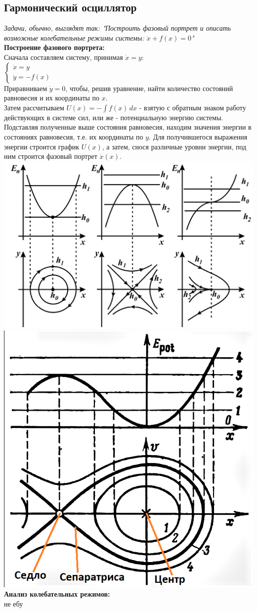 \newcommand{\colontitulAutors}{astronom\_v\_cube, edombek et al.}
\newcommand{\colontitulYear}{2022}
\newcommand{\colontitulEducationalSubject}{Алгоритмы решения задач по теории колебаний}
\newcommand{\colontitulTeacher}{Сутягин А.А.}




	\small
	\begin{multicols*}{2}

		\section{Гармонический осциллятор}

		\textit{Задачи, обычно, выглядят так: "Построить фазовый портрет и описать возможные колебательные режимы системы: $ \ddot{x} + f(x) = 0$"}\\
		\textbf{Построение фазового портрета:}\\
		Сначала составляем систему, принимая $\dot{x} = y$:\\
		$\begin{cases}
			\dot{x} = y \\
			\dot{y} = -f(x)
		\end{cases} $\\
		Приравниваем $\dot{y} = 0$, чтобы, решив уравнение, найти количество состояний равновесия и их координаты по $x$.\\
		Затем рассчитываем $U(x) = -\int f(x) \,dx $ - взятую с обратным знаком работу действующих в системе сил, или же - потенциальную энергию системы. Подставляя полученные выше состояния равновесия, находим значения энергии в состояниях равновесия, т.е. их координаты по $y$. Для получившегося выражения энергии строится график $U(x)$, а затем, снося различные уровни энергии, под ним строится фазовый портрет $\dot{x}(x)$.\\
		\includegraphics[width=0.5\linewidth]{tk_practice_img/oscill}
		\includegraphics[width=0.35\linewidth]{tk_practice_img/oscill_2}\\
		\textbf{Анализ колебательных режимов:}\\
		не ебу\\


\end{multicols*}
